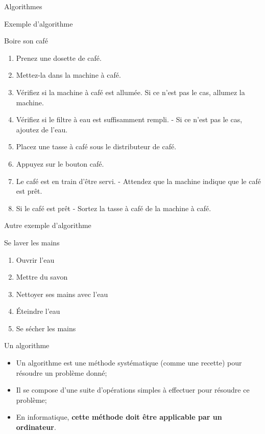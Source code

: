 \documentclass[10pt,xcolor=dvipsnames]{beamer}
\begin{document}
\begin{frame}
  \begin{center}
    {\alert{\huge{Algorithmes}}}
  \end{center}
\end{frame}

\begin{frame}{Exemple d'algorithme}
\begin{alertblock}{Boire son café}
\begin{enumerate}[<+->]
    \item Prenez une dosette de café.
    \item Mettez-la dans la machine à café.
    \item  Vérifiez si la machine à café est allumée. Si ce n'est pas le cas, allumez la machine.
    \item  Vérifiez si le filtre à eau est suffisamment rempli. - Si ce n'est pas le cas, ajoutez de l'eau.
    \item Placez une tasse à café sous le distributeur de café.
    \item Appuyez sur le bouton café.
    \item Le café est en train d'être servi. - Attendez que la machine indique que le café est prêt.
    \item Si le café est prêt - Sortez la tasse à café de la machine à café.
\end{enumerate}
\end{alertblock}

\end{frame}


\begin{frame}{Autre exemple d'algorithme}
\begin{alertblock}{Se laver les mains}
\begin{enumerate}[<+->]
\item Ouvrir l'eau
\item Mettre du savon
\item Nettoyer ses mains avec l'eau
\item Éteindre l'eau
\item Se sécher les mains
\end{enumerate}
\end{alertblock}
\begin{center}
\end{center}
\end{frame}

\begin{frame}{Un algorithme}
    \begin{itemize}
        \item Un algorithme est une méthode systématique (comme une recette) pour résoudre un problème donné;
        \item Il se compose d'une suite d'opérations simples à effectuer pour résoudre ce problème;
        \item En informatique, \textbf{cette méthode doit être applicable par un ordinateur}.
    \end{itemize}
\end{frame}
\end{document}
